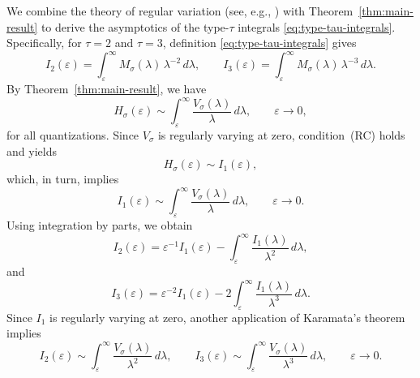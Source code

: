 \documentclass[a4paper,12pt]{article}
\newcommand{\symbolnot}{\sigma}
\begin{document}
We combine the theory of regular variation
(see, e.g., \cite{binghamRegularVariation1987})
with Theorem~\ref{thm:main-result} to derive the asymptotics of the
type-$\tau$ integrals \eqref{eq:type-tau-integrals}.
Specifically, for $\tau=2$ and $\tau=3$, definition \eqref{eq:type-tau-integrals} gives
\[
I_2(\varepsilon)
=
\int_{\varepsilon}^{\infty}
M_{\symbolnot}(\lambda)\,\lambda^{-2}\,d\lambda,
\qquad
I_3(\varepsilon)
=
\int_{\varepsilon}^{\infty}
M_{\symbolnot}(\lambda)\,\lambda^{-3}\,d\lambda.
\]
By Theorem~\ref{thm:main-result}, we have
\[
H_{\symbolnot}(\varepsilon)
\sim
\int_{\varepsilon}^{\infty}
\frac{V_{\symbolnot}(\lambda)}{\lambda}\,d\lambda,
\qquad \varepsilon\to 0,
\]
for all quantizations. Since $V_{\symbolnot}$ is regularly varying at zero,
condition~(RC) holds and \cite[Theorem~2]{allard2025metricentropyminimaxrisk} yields
\[
H_{\symbolnot}(\varepsilon)\sim I_1(\varepsilon),
\]
which, in turn, implies
\[
I_1(\varepsilon)
\sim
\int_{\varepsilon}^{\infty}
\frac{V_{\symbolnot}(\lambda)}{\lambda}\,d\lambda,
\qquad \varepsilon\to 0.
\]
Using integration by parts, we obtain
\[
I_2(\varepsilon)
=
\varepsilon^{-1}I_1(\varepsilon)
-
\int_{\varepsilon}^{\infty}
\frac{I_1(\lambda)}{\lambda^2}\,d\lambda,
\]
and
\[
I_3(\varepsilon)
=
\varepsilon^{-2}I_1(\varepsilon)
-
2\int_{\varepsilon}^{\infty}
\frac{I_1(\lambda)}{\lambda^3}\,d\lambda.
\]
Since $I_1$ is regularly varying at zero, another application of
Karamata’s theorem implies
\[
I_2(\varepsilon)
\sim
\int_{\varepsilon}^{\infty}
\frac{V_{\symbolnot}(\lambda)}{\lambda^{2}}\,d\lambda,
\qquad
I_3(\varepsilon)
\sim
\int_{\varepsilon}^{\infty}
\frac{V_{\symbolnot}(\lambda)}{\lambda^{3}}\,d\lambda,
\qquad \varepsilon\to 0.
\]

\end{document}
